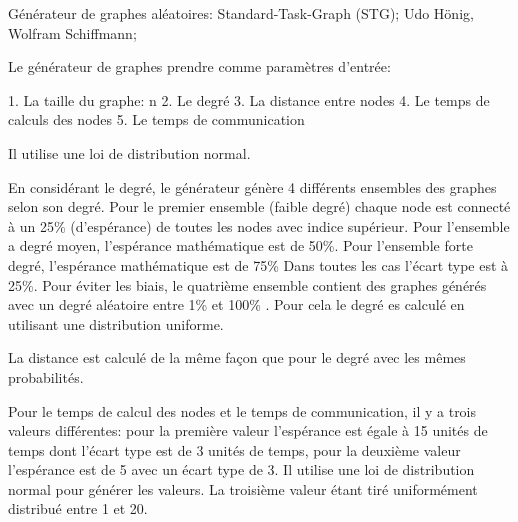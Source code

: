 Générateur de graphes aléatoires: Standard-Task-Graph (STG);
Udo Hönig, Wolfram Schiffmann;


Le générateur de graphes prendre comme paramètres d'entrée:

1. La taille du graphe: n
2. Le degré 
3. La distance entre nodes
4. Le temps de calculs des nodes
5. Le temps de communication

Il utilise une loi de distribution normal.

En considérant le degré, le générateur génère 4 différents ensembles des graphes selon son degré.
Pour le premier ensemble (faible degré) chaque node est connecté à un 25\% (d'espérance) de toutes les nodes avec indice supérieur.
Pour l'ensemble a degré moyen, l'espérance mathématique est de 50\%.
Pour l'ensemble forte degré,  l'espérance mathématique est de 75\%
Dans toutes les cas l'écart type est à 25\%.
Pour éviter les biais, le quatrième ensemble contient des graphes générés avec un degré aléatoire entre 1\% et 100\% . Pour cela le degré es calculé en utilisant une distribution uniforme.

La distance est calculé de la même façon que pour le degré avec les mêmes probabilités.

Pour le temps de calcul des nodes et le temps de communication, il y a trois valeurs différentes: pour la première valeur  l'espérance est égale à 15 unités de temps dont l'écart type est de 3 unités de temps, pour la deuxième valeur  l'espérance est de 5 avec un écart type de 3. Il utilise une loi de distribution normal pour générer les valeurs. La troisième valeur  étant tiré uniformément distribué entre 1 et 20.
